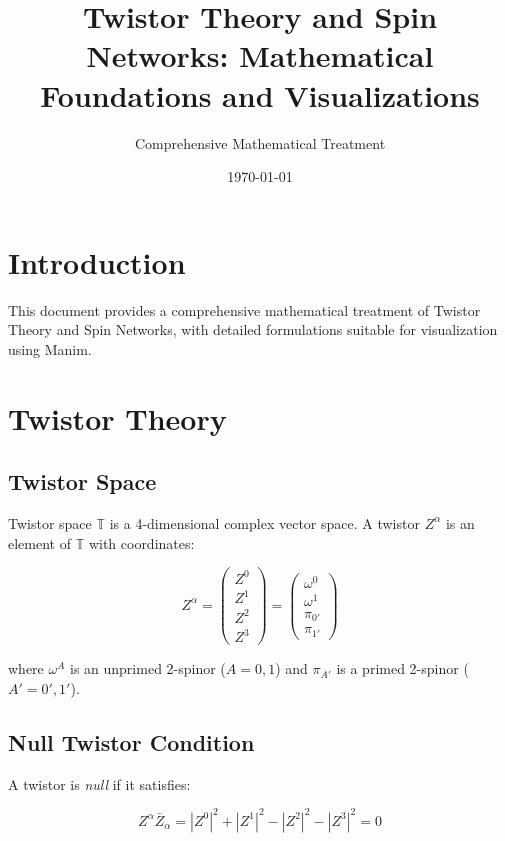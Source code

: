 \documentclass[12pt,a4paper]{article}
\title{Twistor Theory and Spin Networks: Mathematical Foundations and Visualizations}
\author{Comprehensive Mathematical Treatment}
\date{\today}
\begin{document}
\maketitle

\tableofcontents
\newpage

\section{Introduction}

This document provides a comprehensive mathematical treatment of Twistor Theory and Spin Networks, with detailed formulations suitable for visualization using Manim.

\section{Twistor Theory}

\subsection{Twistor Space}

Twistor space $\mathbb{T}$ is a 4-dimensional complex vector space. A twistor $Z^\alpha$ is an element of $\mathbb{T}$ with coordinates:

\begin{equation}
Z^\alpha = \begin{pmatrix} Z^0 \\ Z^1 \\ Z^2 \\ Z^3 \end{pmatrix} = \begin{pmatrix} \omega^0 \\ \omega^1 \\ \pi_{0'} \\ \pi_{1'} \end{pmatrix}
\end{equation}

where $\omega^A$ is an unprimed 2-spinor ($A = 0, 1$) and $\pi_{A'}$ is a primed 2-spinor ($A' = 0', 1'$).

\subsection{Null Twistor Condition}

A twistor is \textit{null} if it satisfies:

\begin{equation}
Z^\alpha \bar{Z}_\alpha = |Z^0|^2 + |Z^1|^2 - |Z^2|^2 - |Z^3|^2 = 0
\end{equation}
\end{document}
